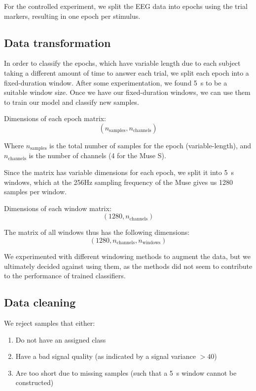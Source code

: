         For the controlled experiment, we split the EEG data into epochs using the trial markers, resulting in one epoch per stimulus.

    \subsection{Data transformation}\label{section:transform}

        In order to classify the epochs, which have variable length due to each subject taking a different amount of time to answer each trial, we split each epoch into a fixed-duration window. After some experimentation, we found \SI{5}{\second} to be a suitable window size. Once we have our fixed-duration windows, we can use them to train our model and classify new samples.

        Dimensions of each epoch matrix: \[ (n_{\mathrm{samples}}, n_{\mathrm{channels}}) \]

        Where $n_{\mathrm{samples}}$ is the total number of samples for the epoch (variable-length), and $n_{\mathrm{channels}}$ is the number of channels (4 for the Muse S).

        Since the matrix has variable dimensions for each epoch, we split it into \SI{5}{\second} windows, which at the 256Hz sampling frequency of the Muse gives us 1280 samples per window.

        Dimensions of each window matrix: \[ (1280, n_{\mathrm{channels}}) \]

        The matrix of all windows thus has the following dimensions: \[ (1280, n_{\mathrm{channels}}, n_{\mathrm{windows}}) \]

        We experimented with different windowing methods to augment the data, but we ultimately decided against using them, as the methods did not seem to contribute to the performance of trained classifiers.

    \subsection{Data cleaning}

        We reject samples that either:

        \begin{enumerate}
            \item Do not have an assigned class
            \item Have a bad signal quality (as indicated by a signal variance $>40$)
            \item Are too short due to missing samples (such that a \SI{5}{\second} window cannot be constructed)
        \end{enumerate}

